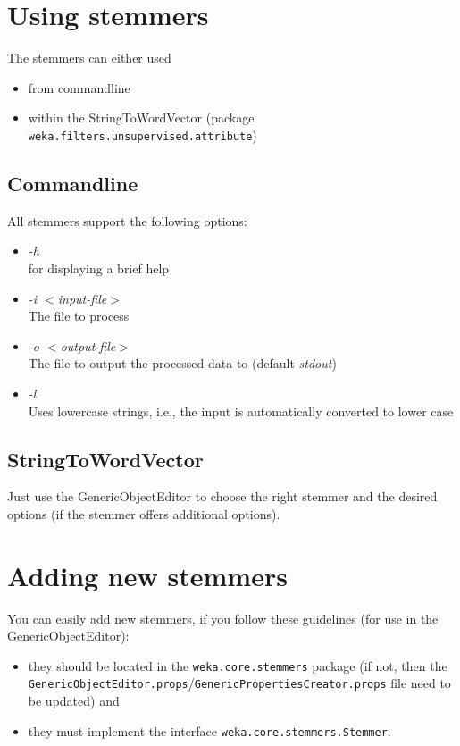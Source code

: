 \newpage
\section{Using stemmers}
The stemmers can either used

\begin{itemize}
	\item from commandline
	\item within the StringToWordVector (package \texttt{weka.filters.unsupervised.attribute})
\end{itemize}

\subsection{Commandline}
All stemmers support the following options:

\begin{itemize}
	\item \textit{-h} \\
		for displaying a brief help
	\item \textit{-i $<$input-file$>$} \\
		The file to process
	\item \textit{-o $<$output-file$>$} \\
		The file to output the processed data to (default \textit{stdout})
	\item \textit{-l} \\
		Uses lowercase strings, i.e., the input is automatically converted to lower case
\end{itemize}

\subsection{StringToWordVector}
Just use the GenericObjectEditor to choose the right stemmer and the desired options (if the stemmer offers additional options).

\section{Adding new stemmers}
You can easily add new stemmers, if you follow these guidelines (for use in the GenericObjectEditor):

\begin{itemize}
	\item they should be located in the \texttt{weka.core.stemmers} package (if not, then the \texttt{GenericObjectEditor.props}/\texttt{GenericPropertiesCreator.props} file need to be updated) and
	\item they must implement the interface \texttt{weka.core.stemmers.Stemmer}.
\end{itemize}
